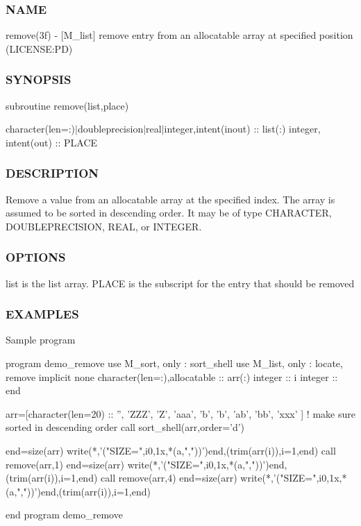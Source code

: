 \subsubsection*{N\+A\+ME}

remove(3f) -\/ \mbox{[}M\+\_\+list\mbox{]} remove entry from an allocatable array at specified position (L\+I\+C\+E\+N\+SE\+:PD) 

\subsubsection*{S\+Y\+N\+O\+P\+S\+IS}

subroutine remove(list,place)

character(len=\+:)$\vert$doubleprecision$\vert$real$\vert$integer,intent(inout) \+:\+: list(\+:) integer, intent(out) \+:\+: P\+L\+A\+CE

\subsubsection*{D\+E\+S\+C\+R\+I\+P\+T\+I\+ON}

\begin{DoxyVerb}Remove a value from an allocatable array at the specified index.
The array is assumed to be sorted in descending order. It may be of
type CHARACTER, DOUBLEPRECISION, REAL, or INTEGER.
\end{DoxyVerb}


\subsubsection*{O\+P\+T\+I\+O\+NS}

\begin{DoxyVerb}list    is the list array.
PLACE   is the subscript for the entry that should be removed
\end{DoxyVerb}


\subsubsection*{E\+X\+A\+M\+P\+L\+ES}

\begin{DoxyVerb}Sample program

 program demo_remove
 use M_sort, only : sort_shell
 use M_list, only : locate, remove
 implicit none
 character(len=:),allocatable :: arr(:)
 integer                       :: i
 integer                       :: end

 arr=[character(len=20) :: '', 'ZZZ', 'Z', 'aaa', 'b', 'b', 'ab', 'bb', 'xxx' ]
 ! make sure sorted in descending order
 call sort_shell(arr,order='d')

 end=size(arr)
 write(*,'("SIZE=",i0,1x,*(a,","))')end,(trim(arr(i)),i=1,end)
 call remove(arr,1)
 end=size(arr)
 write(*,'("SIZE=",i0,1x,*(a,","))')end,(trim(arr(i)),i=1,end)
 call remove(arr,4)
 end=size(arr)
 write(*,'("SIZE=",i0,1x,*(a,","))')end,(trim(arr(i)),i=1,end)

 end program demo_remove
\end{DoxyVerb}


